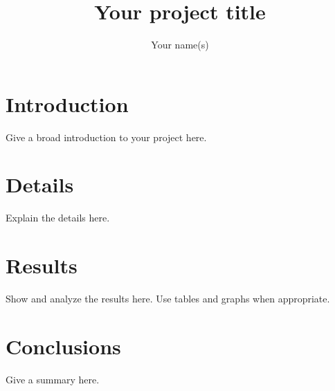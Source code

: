 \documentclass[11pt]{article}
\title{Your project title}
\author{Your name(s)}
\begin{document}
\maketitle

\section{Introduction}

Give a broad introduction to your project here.

\section{Details}

Explain the details here.

\section{Results}

Show and analyze the results here.  Use tables and graphs when
appropriate.

\section{Conclusions}

Give a summary here. 
\end{document}
